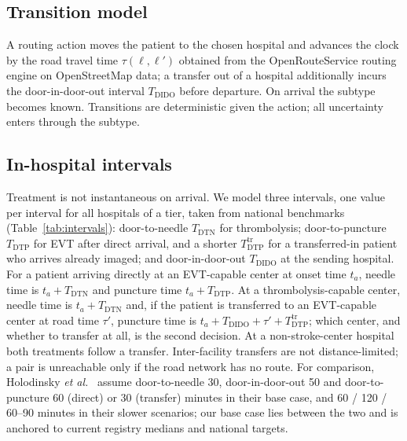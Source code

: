\subsection{Transition model}
A routing action moves the patient to the chosen hospital and advances the clock by the road travel time $\tau(\ell, \ell')$ obtained from the OpenRouteService routing engine on OpenStreetMap data; a transfer out of a hospital additionally incurs the door-in-door-out interval $T_{\text{DIDO}}$ before departure. On arrival the subtype becomes known. Transitions are deterministic given the action; all uncertainty enters through the subtype.

\subsection{In-hospital intervals}
Treatment is not instantaneous on arrival. We model three intervals, one value per interval for all hospitals of a tier, taken from national benchmarks (Table~\ref{tab:intervals}): door-to-needle $T_{\text{DTN}}$ for thrombolysis; door-to-puncture $T_{\text{DTP}}$ for EVT after direct arrival, and a shorter $T_{\text{DTP}}^{\text{tr}}$ for a transferred-in patient who arrives already imaged; and door-in-door-out $T_{\text{DIDO}}$ at the sending hospital. For a patient arriving directly at an EVT-capable center at onset time $t_a$, needle time is $t_a + T_{\text{DTN}}$ and puncture time $t_a + T_{\text{DTP}}$. At a thrombolysis-capable center, needle time is $t_a + T_{\text{DTN}}$ and, if the patient is transferred to an EVT-capable center at road time $\tau'$, puncture time is $t_a + T_{\text{DIDO}} + \tau' + T_{\text{DTP}}^{\text{tr}}$; which center, and whether to transfer at all, is the second decision. At a non-stroke-center hospital both treatments follow a transfer. Inter-facility transfers are not distance-limited; a pair is unreachable only if the road network has no route. For comparison, Holodinsky \emph{et al.}~\cite{holodinsky2018} assume door-to-needle 30, door-in-door-out 50 and door-to-puncture 60 (direct) or 30 (transfer) minutes in their base case, and 60 / 120 / 60--90 minutes in their slower scenarios; our base case lies between the two and is anchored to current registry medians and national targets.

